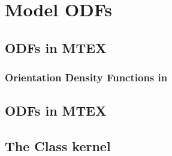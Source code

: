 \section{Model ODFs}


\subsection*{ODFs in MTEX}


\begin{frame}[fragile]
  \frametitle{Orientation Density Functions in \MTEX}



\end{frame}

\subsection*{ODFs in MTEX}


\subsection*{The Class kernel}


